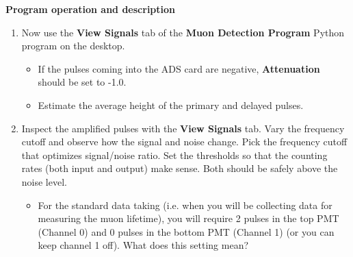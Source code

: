 \documentclass{../lab}
\begin{document}
\textbf{Program operation and description}

\begin{enumerate}
    \item Now use the \textbf{View Signals} tab of the \textbf{Muon Detection Program} Python program on the desktop.

    \begin{itemize}
        \item If the pulses coming into the ADS card are negative, \textbf{Attenuation} should be set to -1.0.

        \item Estimate the average height of the primary and delayed pulses.

    \end{itemize}

    \item Inspect the amplified pulses with the \textbf{View Signals} tab. Vary the frequency cutoff and observe how the signal and noise change. Pick the frequency cutoff that optimizes signal/noise ratio. Set the thresholds so that the counting rates (both input and output) make sense. Both should be safely above the noise level.

    \begin{itemize}
        \item For the standard data taking (i.e. when you will be collecting data for measuring the muon lifetime), you will require 2 pulses in the top PMT (Channel 0) and 0 pulses in the bottom PMT (Channel 1) (or you can keep channel 1 off). What does this setting mean?

    \end{itemize}


\end{enumerate}
\end{document}
